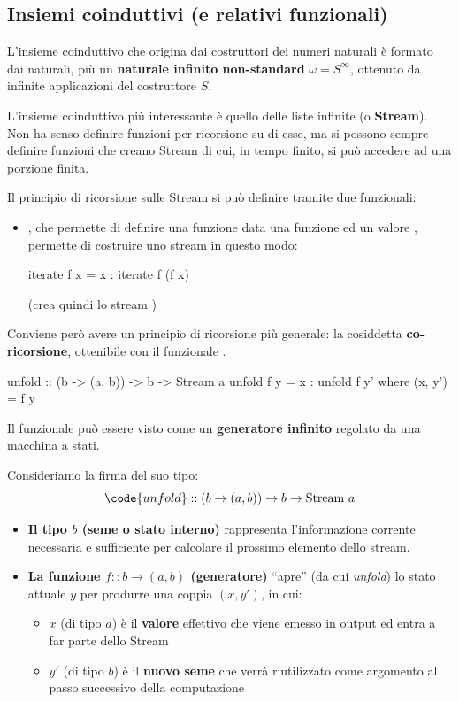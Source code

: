 \subsection{Insiemi coinduttivi (e relativi funzionali)}
L'insieme coinduttivo che origina dai costruttori dei numeri naturali è formato dai naturali, più un \textbf{naturale infinito non-standard} $\omega = S^{\infty}$, ottenuto da infinite applicazioni del costruttore $S$.

L'insieme coinduttivo più interessante è quello delle liste infinite (o \textbf{Stream}). Non ha senso definire funzioni per ricorsione su di esse, ma si possono sempre definire funzioni che creano Stream di cui, in tempo finito, si può accedere ad una porzione finita.

Il principio di ricorsione sulle Stream si può definire tramite due funzionali:
\begin{itemize}
    \item {}, che permette di definire una funzione 
        \subitem data una funzione  ed un valore , permette di costruire uno stream in questo modo:
        \begin{haskellbox}{}
iterate f x = x : iterate f (f x)
        \end{haskellbox}

        (crea quindi lo stream )
\end{itemize}

Conviene però avere un principio di ricorsione più generale: la cosiddetta \textbf{co-ricorsione}, ottenibile con il funzionale .

\begin{haskellbox}{}
unfold :: (b -> (a, b)) -> b -> Stream a
unfold f y = x : unfold f y' where (x, y') = f y
\end{haskellbox}

Il funzionale  può essere visto come un \textbf{generatore infinito} regolato da una macchina a stati.

Consideriamo la firma del suo tipo:
\[ \code{unfold} :: (b \to (a, b)) \to b \to \text{Stream } a \]

\begin{itemize}
    \item \textbf{Il tipo $b$ (seme o stato interno)} rappresenta l'informazione corrente necessaria e sufficiente per calcolare il prossimo elemento dello stream.
    \item \textbf{La funzione $f :: b \to (a, b)$ (generatore)} ``apre'' (da cui \textit{unfold}) lo stato attuale $y$ per produrre una coppia $(x, y')$, in cui:
    \begin{itemize}
        \item $x$ (di tipo $a$) è il \textbf{valore} effettivo che viene emesso in output ed entra a far parte dello Stream
        \item $y'$ (di tipo $b$) è il \textbf{nuovo seme} che verrà riutilizzato come argomento al passo successivo della computazione
    \end{itemize}
\end{itemize}

